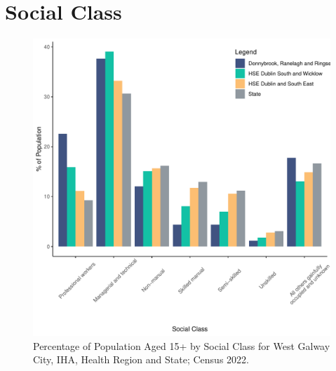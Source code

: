 \documentclass{article}
\begin{document}
\section{Social Class}\label{sect:SC}
\begin{figure}[H]
	\centering
	\includegraphics[width = 140mm]{../figures/SocialClassED.pdf}
	\caption{Percentage of Population Aged 15+ by Social Class for West Galway City, IHA, Health Region and State; Census 2022.}
	\label{fig:vbnv}
	\end{figure}
\end{document}
